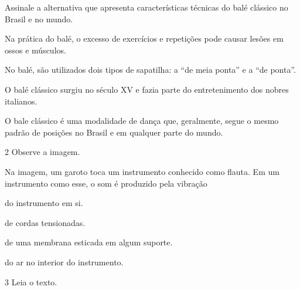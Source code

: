 Assinale a alternativa que apresenta características técnicas do balé
clássico no Brasil e no mundo.

\begin{escolha}
\item
  Na prática do balé, o excesso de exercícios e repetições pode causar
  lesões em ossos e músculos.
\item
  No balé, são utilizados dois tipos de sapatilha: a “de meia ponta” e
  a “de ponta”.
\item
  O balé clássico surgiu no século XV e fazia parte do entretenimento
  dos nobres italianos.
\item
  O bale clássico é uma modalidade de dança que, geralmente, segue o
  mesmo padrão de posições no Brasil e em qualquer parte do mundo.
\end{escolha}


\num{2} Observe a imagem.


Na imagem, um garoto toca um instrumento conhecido como flauta. Em um instrumento como esse, o som é produzido pela vibração

\begin{minipage}{.5\textwidth}
\begin{escolha}
\item
  do instrumento em si.
\item
  de cordas tensionadas.
\item
  de uma membrana esticada em algum suporte.
\item
  do ar no interior do instrumento.
\end{escolha}
\end{minipage}

\num{3}  Leia o texto.

